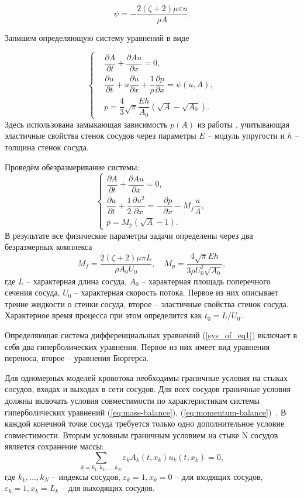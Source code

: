 $$
\psi = -\frac{2 (\zeta + 2) \mu \pi u}{\rho A}.
$$

Запишем определяющую систему уравнений в виде

\begin{equation*}
    \begin{cases}
	&\dfrac{\partial A}{\partial t}+\dfrac{\partial Au}{\partial x}=0,\\[10pt]
	&\dfrac{\partial u}{\partial t}+u\dfrac{\partial u}{\partial x}+\dfrac{1}{\rho}\dfrac{\partial p}{\partial x}=\psi(u, A),\\[10pt]
	&p=\dfrac{4}{3}\sqrt{\pi}\dfrac{Eh}{A_0}(\sqrt{A}-\sqrt{A_0}).
    \end{cases}
\end{equation*}
Здесь использована замыкающая зависимость $p(A)$ из работы \cite{boileau:2015}, учитывающая
эластичные свойства стенок сосудов через параметры $E$ -- модуль упругости и $h$ -- толщина стенок сосуда.

Проведём обезразмеривание системы:
\begin{equation}
    \label{sys_of_eq1}
    \begin{cases}
	\dfrac{\partial A}{\partial t}+\dfrac{\partial Au}{\partial x}=0,\\[10pt]
	\dfrac{\partial u}{\partial t}+\dfrac{1}{2}\dfrac{\partial u^2}{\partial x} = -\dfrac{\partial p}{\partial x}-M_f \dfrac{u}{A},\\[10pt]
	p=M_p(\sqrt{A}-1).
    \end{cases}
    \end{equation}
В результате все физические параметры задачи определены через два безразмерных комплекса
$$
M_f=\frac{2(\zeta+2)\mu \pi L}{\rho A_0 U_0}, \quad
M_p=\frac{4\sqrt{\pi}Eh}{3 \rho U_0^2\sqrt{A_0}},
$$
где $L$ -- характерная длина сосуда, $A_0$ -- характерная площадь поперечного сечения сосуда, $U_0$ -- характерная скорость потока.
Первое из них описывает трение жидкости о стенки сосуда, второе -- эластичные свойства стенок сосуда.
Характерное время процесса при этом определится как $t_0 = L/U_0$.

Определяющая система дифференциальных уравнений (\ref{sys_of_eq1}) включает в себя два гиперболических уравнения.
Первое из них имеет вид уравнения переноса, второе -- уравнения Бюргерса.

Для одномерных моделей кровотока необходимы граничные условия на стыках сосудов, входах и выходах в сети сосудов.
Для всех сосудов граничные условия должны включать условия совместимости по характеристикам системы гиперболических уравнений (\ref{eq:mass-balance}), (\ref{eq:momentum-balance})~\cite{Xiu:2007}.
В каждой конечной точке сосуда требуется только одно дополнительное условие совместимости.
Вторым условным граничным условием на стыке N сосудов является сохранение массы:
\begin{equation}
    \label{eq:conserv-mass}
    \sum_{k=k_1,k_2,...,k_N} \varepsilon_k A_k(t,x_k)u_k(t,x_k)=0,
\end{equation}
где {$k_1,...,k_N$} -- индексы сосудов, $\varepsilon_k=1, x_k=0$ -- для входящих сосудов,
$\varepsilon_k=1, x_k=L_k$ -- для выходящих сосудов.

